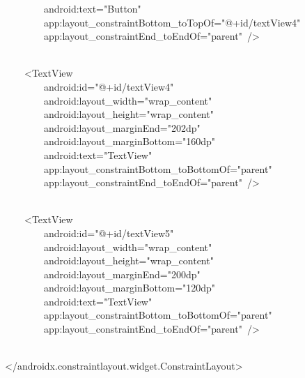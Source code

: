 {\ttfamily\small \ \ \ \ \ \ \ \ android:text="Button"} \\
{\ttfamily\small \ \ \ \ \ \ \ \ app:layout\_constraintBottom\_toTopOf="@+id/textView4"} \\
{\ttfamily\small \ \ \ \ \ \ \ \ app:layout\_constraintEnd\_toEndOf="parent"\ /\textgreater{}} \\
\strut \\
{\ttfamily\small \ \ \ \ \textless{}TextView} \\
{\ttfamily\small \ \ \ \ \ \ \ \ android:id="@+id/textView4"} \\
{\ttfamily\small \ \ \ \ \ \ \ \ android:layout\_width="wrap\_content"} \\
{\ttfamily\small \ \ \ \ \ \ \ \ android:layout\_height="wrap\_content"} \\
{\ttfamily\small \ \ \ \ \ \ \ \ android:layout\_marginEnd="202dp"} \\
{\ttfamily\small \ \ \ \ \ \ \ \ android:layout\_marginBottom="160dp"} \\
{\ttfamily\small \ \ \ \ \ \ \ \ android:text="TextView"} \\
{\ttfamily\small \ \ \ \ \ \ \ \ app:layout\_constraintBottom\_toBottomOf="parent"} \\
{\ttfamily\small \ \ \ \ \ \ \ \ app:layout\_constraintEnd\_toEndOf="parent"\ /\textgreater{}} \\
\strut \\
{\ttfamily\small \ \ \ \ \textless{}TextView} \\
{\ttfamily\small \ \ \ \ \ \ \ \ android:id="@+id/textView5"} \\
{\ttfamily\small \ \ \ \ \ \ \ \ android:layout\_width="wrap\_content"} \\
{\ttfamily\small \ \ \ \ \ \ \ \ android:layout\_height="wrap\_content"} \\
{\ttfamily\small \ \ \ \ \ \ \ \ android:layout\_marginEnd="200dp"} \\
{\ttfamily\small \ \ \ \ \ \ \ \ android:layout\_marginBottom="120dp"} \\
{\ttfamily\small \ \ \ \ \ \ \ \ android:text="TextView"} \\
{\ttfamily\small \ \ \ \ \ \ \ \ app:layout\_constraintBottom\_toBottomOf="parent"} \\
{\ttfamily\small \ \ \ \ \ \ \ \ app:layout\_constraintEnd\_toEndOf="parent"\ /\textgreater{}} \\
\strut \\
{\ttfamily\small \textless{}/androidx.constraintlayout.widget.ConstraintLayout\textgreater{}} \\
